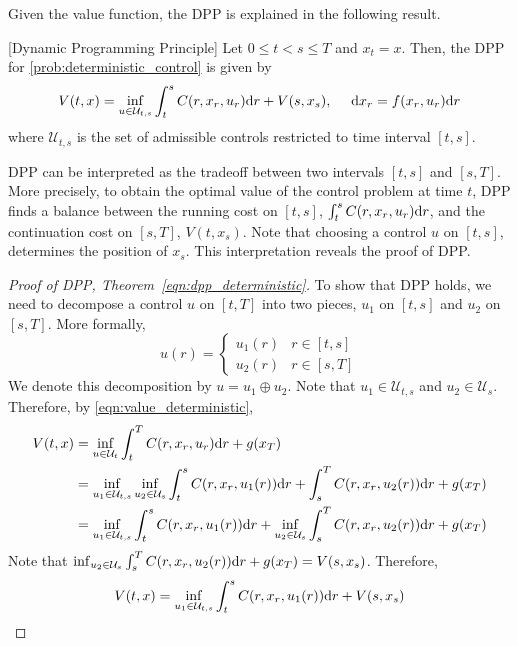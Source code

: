 \documentclass[11pt]{book}
\newcommand{\dr}{\text{\normalfont d}r}
\newcommand{\dx}{\text{\normalfont d}x}
\begin{document}
Given the value function, the DPP is explained in the following result.
\begin{thm}\label{thm:dpp_deterministic}
    [Dynamic Programming Principle]
    Let $0\le t<s\le T$ and $x_t=x$. Then, the DPP for \eqref{prob:deterministic_control} is given by 
    \begin{equation}\label{eqn:dpp_deterministic}
    V(t,x) =\inf_{u\in\mathcal{U}_{t,s}}\int_t^sC(r,x_r,u_r){{\dr}}+V(s,x_s),~~~~{\dx}_r=f(x_r,u_r){{\dr}}
\end{equation}
where $\mathcal{U}_{t,s}$ is the set of admissible controls restricted to time interval $[t,s]$.
\end{thm}
DPP can be interpreted as the tradeoff between two intervals $[t,s]$ and $[s,T]$. More precisely, to obtain the optimal value of the control problem at time $t$, DPP finds a balance between the running cost on $[t,s]$, $\int_t^sC(r,x_r,u_r){{\dr}}$, and the continuation cost on $[s,T]$, $V(t,x_s)$. Note that choosing a control $u$ on $[t,s]$, determines the position of $x_s$.
This interpretation reveals the proof of DPP.
\begin{proof}
    [Proof of DPP, Theorem~\ref{eqn:dpp_deterministic}]
    To show that DPP holds, we need to decompose a control $u$ on $[t,T]$ into two pieces, $u_1$ on $[t,s]$ and $u_2$ on $[s,T]$. More formally,
    \[
    u(r) =\begin{cases}
        u_1(r)& r\in[t,s]\\
        u_2(r)& r\in[s,T]
    \end{cases} 
    \]
    We denote this decomposition by $u=u_1\oplus u_2$. Note that $u_1\in\mathcal{U}_{t,s}$ and $u_2\in\mathcal{U}_{s}$.
    Therefore, by \eqref{eqn:value_deterministic},
    \[
    \begin{split}
        V(t,x)&= \inf_{u\in\mathcal{U}_{t}}\int_t^TC(r,x_r,u_r){{\dr}}+g(x_T)\\
        &= \inf_{u_1\in\mathcal{U}_{t,s}}\inf_{u_2\in\mathcal{U}_{s}}\int_t^sC(r,x_r,u_1(r)){{\dr}}+\int_s^TC(r,x_r,u_2(r)){{\dr}}+g(x_T)\\
        &=
        \inf_{u_1\in\mathcal{U}_{t,s}} \int_t^sC(r,x_r,u_1(r)){{\dr}} + \inf_{u_2\in\mathcal{U}_{s}}\int_s^TC(r,x_r,u_2(r)){{\dr}}+g(x_T)\\
    \end{split}
    \]
    Note that $\inf_{u_2\in\mathcal{U}_{s}}\int_s^TC(r,x_r,u_2(r)){{\dr}}+g(x_T)=V(s,x_s)$. Therefore,
     \[
        V(t,x)= 
        \inf_{u_1\in\mathcal{U}_{t,s}} \int_t^sC(r,x_r,u_1(r)){{\dr}} + V(s,x_s)
    \]
\end{proof}
\end{document}
